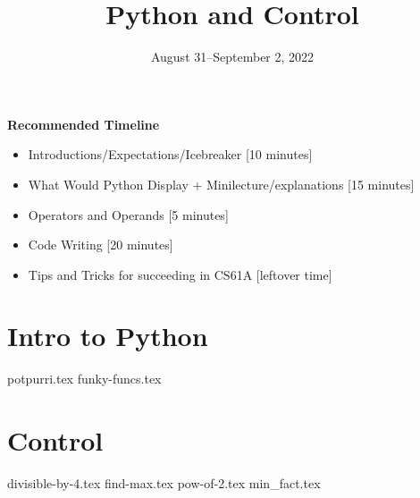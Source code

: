 \documentclass{exam}
\title{Python and Control}
\date{August 31--September 2, 2022}
\begin{document}
\maketitle
\begin{guide}
\textbf{Recommended Timeline}
\begin{itemize}
  \item Introductions/Expectations/Icebreaker [10 minutes]
  \item What Would Python Display + Minilecture/explanations [15 minutes]
  \item Operators and Operands [5 minutes]
  \item Code Writing [20 minutes]
  \item Tips and Tricks for succeeding in CS61A [leftover time]
\end{itemize}
\end{guide}


\section{Intro to Python}
\begin{questions}
{potpurri.tex}
{funky-funcs.tex}
\end{questions}

\section{Control}
\begin{questions}
{divisible-by-4.tex}
{find-max.tex}
{pow-of-2.tex}
{min_fact.tex}
\end{questions}
\end{document}
